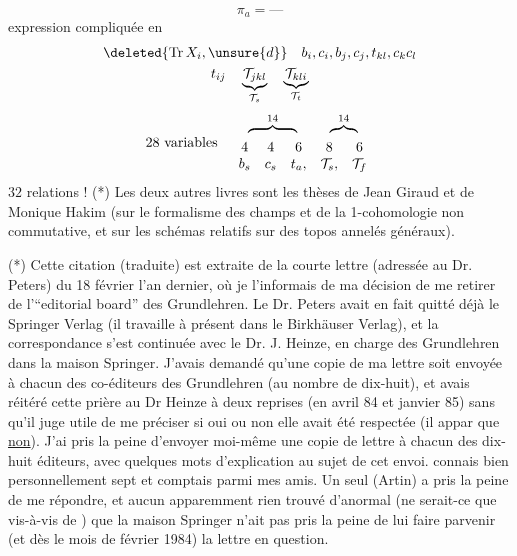 \[\pi_a=\text{---}\]
expression  compliquée en
\[\begin{gathered}
\deleted{\operatorname{Tr}X_i,\unsure{d}}\quad b_i,c_i,b_j,c_j,t_{kl},c_kc_l\\
t_{ij}\quad\underbrace{\mathcal T_{jkl}}_{\mathcal T_s}\quad
\underbrace{\mathcal T_{kli}}_{\mathcal T_t}
\end{gathered}\]
\[
28\text{ variables}\quad
\begin{array}{ccccc}
\multicolumn{3}{c}{\overbrace{\phantom{4\quad4\quad6}}^{14}}&
\multicolumn{2}{c}{\overbrace{\phantom{8\quad6}}^{14}}\\[-.6em]
4&4&6&8&6\\
b_s&c_s&t_a,&\mathcal T_s,&\mathcal T_f
\end{array}
\]
$32$ relations !
(*\deleted{*}) Les deux autres livres sont les thèses de Jean Giraud et de  Monique Hakim (sur le formalisme des champs et de la 1-cohomologie non commutative, et sur les schémas relatifs sur des topos annelés généraux).

(*) Cette citation (traduite) est extraite de la courte lettre (adressée au Dr. Peters) du 18 février l'an dernier, où je l'informais de ma décision de me retirer de l'``editorial board'' des Grundlehren. Le Dr. Peters avait en fait quitté déjà le Springer Verlag (il travaille à présent dans le Birkhäuser Verlag), et la correspondance s'est continuée avec le  Dr. J. Heinze, en charge des Grundlehren dans la maison Springer. J'avais demandé qu'une copie de ma lettre soit envoyée à chacun des co-éditeurs des Grundlehren (au nombre de dix-huit), et avais réitéré cette prière\deleted{,} au Dr Heinze\deleted{,} à deux reprises (en avril 84 et janvier 85) sans qu'il juge utile de me  préciser si oui ou non elle avait été respectée (il  appar que \uline{non}). J'ai pris la peine d'envoyer moi-même une copie de  lettre  à chacun des dix-huit éditeurs, avec quelques mots d'explication  au sujet de cet envoi.  connais bien personnellement sept   et   comptais parmi mes amis. Un seul  (Artin) a pris la peine de me répondre, et aucun apparemment  rien trouvé d'anormal  (ne serait-ce que vis-à-vis de ) que la maison Springer n'ait pas pris la peine de lui faire parvenir   (et dès le mois de février 1984) la lettre en question.

